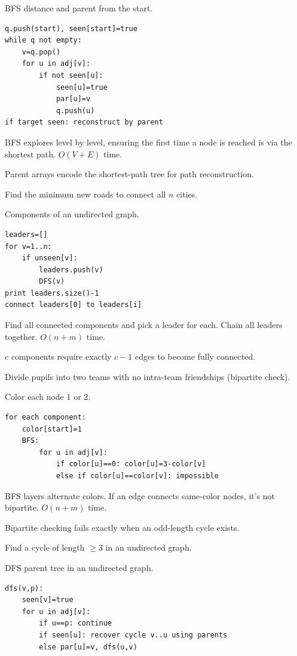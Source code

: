 \State BFS distance and parent from the start.
\begin{lstlisting}
q.push(start), seen[start]=true
while q not empty:
    v=q.pop()
    for u in adj[v]:
        if not seen[u]:
            seen[u]=true
            par[u]=v
            q.push(u)
if target seen: reconstruct by parent
\end{lstlisting}

\Solution BFS explores level by level, ensuring the first time a node is reached is via the shortest path. $O(V+E)$ time.

\Analysis Parent arrays encode the shortest-path tree for path reconstruction.


\Problem Find the minimum new roads to connect all $n$ cities.

\State Components of an undirected graph.
\begin{lstlisting}
leaders=[]
for v=1..n:
    if unseen[v]:
        leaders.push(v)
        DFS(v)
print leaders.size()-1
connect leaders[0] to leaders[i]
\end{lstlisting}

\Solution Find all connected components and pick a leader for each. Chain all leaders together. $O(n+m)$ time.

\Analysis $c$ components require exactly $c-1$ edges to become fully connected.


\Problem Divide pupils into two teams with no intra-team friendships (bipartite check).

\State Color each node 1 or 2.
\begin{lstlisting}
for each component:
    color[start]=1
    BFS:
        for u in adj[v]:
            if color[u]==0: color[u]=3-color[v]
            else if color[u]==color[v]: impossible
\end{lstlisting}

\Solution BFS layers alternate colors. If an edge connects same-color nodes, it's not bipartite. $O(n+m)$ time.

\Analysis Bipartite checking fails exactly when an odd-length cycle exists.


\Problem Find a cycle of length $\ge 3$ in an undirected graph.

\State DFS parent tree in an undirected graph.
\begin{lstlisting}
dfs(v,p):
    seen[v]=true
    for u in adj[v]:
        if u==p: continue
        if seen[u]: recover cycle v..u using parents
        else par[u]=v, dfs(u,v)
\end{lstlisting}

